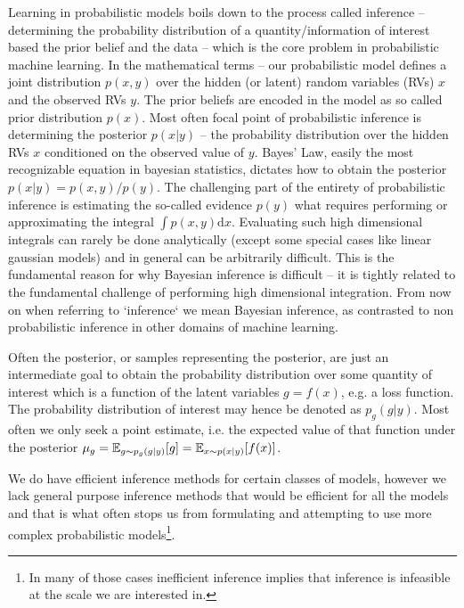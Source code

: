\documentclass[12pt]{article}
\begin{document}
Learning in probabilistic models boils down to the process called inference -- determining the probability distribution of a quantity/information of interest based the prior belief and the data -- which is the core problem in probabilistic machine learning.
In the mathematical terms -- our probabilistic model defines a joint distribution $p(x,y)$ over the hidden (or latent) random variables (RVs) $x$ and the observed RVs $y$.
The prior beliefs are encoded in the model as so called prior distribution $p(x)$.
Most often focal point of probabilistic inference is determining the posterior $p(x|y)$ -- the probability distribution over the hidden RVs $x$ conditioned on the observed value of $y$.
Bayes' Law, easily the most recognizable equation in bayesian statistics, dictates how to obtain the posterior $p(x|y) = p(x,y)/p(y)$.
The challenging part of the entirety of probabilistic inference is estimating the so-called evidence $p(y)$ what requires performing or approximating the integral $\int p(x,y) \text{d}x$.
Evaluating such high dimensional integrals can rarely be done analytically (except some special cases like linear gaussian models) and in general can be arbitrarily difficult.
This is the fundamental reason for why Bayesian inference is difficult -- it is tightly related to the fundamental challenge of performing high dimensional integration. 
From now on when referring to `inference` we mean Bayesian inference, as contrasted to non probabilistic inference in other domains of machine learning.

Often the posterior, or samples representing the posterior, are just an intermediate goal to
obtain the probability distribution over some quantity of interest which is a function of the latent variables $g=f(x)$, e.g. a loss function.
The probability distribution of interest may hence be denoted as $p_g(g|y)$.
Most often we only seek a point estimate, i.e. the expected value of that function under the posterior $\mu_g=\mathbb{E}_{g \sim p_g(g|y)}[g]=\mathbb{E}_{x \sim p(x|y)}[f(x)]$.

We do have efficient inference methods for certain classes of models, however we lack general purpose inference methods that would be efficient for all the models and that is what often stops us from formulating and attempting to use more complex probabilistic 
models\footnote{In many of those cases inefficient inference implies that inference is infeasible at the scale we are interested in.}.

\end{document}

